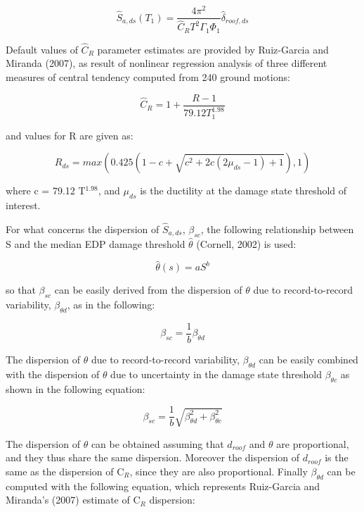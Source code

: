 \begin{equation}
\hat{S}_{a,ds}(T_1) = \frac{4 \pi^2}{\hat{C}_R T^2 \Gamma_1 \Phi_1} \hat{\delta}_{roof, ds}
\label{eq:Sa_RGM}
\end{equation}

Default values of $\hat{C}_R$ parameter estimates are provided by Ruiz-Garcia and Miranda (2007), as result of nonlinear regression analysis of three different measures of central tendency computed from 240 ground motions:

\begin{equation}
\hat{C}_R = 1 + \frac{R - 1}{79.12 T_1 ^{1.98}}
\label{eq:Cr_RGM}
\end{equation}

and values for R are given as:

\begin{equation}
R_{ds} = max(0.425(1 - c + \sqrt{c^2 + 2c(2 \mu_{ds} - 1) + 1}),1)
\label{eq:R_RGM}
\end{equation}

where c = 79.12 T$^{1.98}$, and $\mu_{ds}$ is the ductility at the damage state threshold of interest.

For what concerns the dispersion of $\hat{S}_{a,ds}$, $\beta_{sc}$, the following relationship between S and the median EDP damage threshold $\hat{\theta}$ (Cornell, 2002) is used:

\begin{equation}
\hat{\theta}(s) = a S^b
\end{equation}

so that $\beta_{sc}$ can be easily derived from the dispersion of $\theta$ due to record-to-record variability, $\beta_{\theta d}$, as in the following:

\begin{equation}
\beta_{sc} = \frac{1}{b} \beta_{\theta d}
\label{eq:betaSa_RGM}
\end{equation}

The dispersion of $\theta$ due to record-to-record variability, $\beta_{\theta d}$ can be easily combined with the dispersion of $\theta$ due to uncertainty in the damage state threshold $\beta_{\theta c}$ as shown in the following equation:

\begin{equation}
\beta_{sc} = \frac{1}{b} \sqrt{\beta_{\theta d}^2 + \beta_{\theta c}^2}
\label{eq:betaSc_RGM}
\end{equation}

The dispersion of $\theta$ can be obtained assuming that $d_{roof}$ and $\theta$ are proportional, and they thus share the same dispersion. Moreover the dispersion of $d_{roof}$ is the same as the dispersion of C$_R$, since they are also proportional. Finally $\beta_{\theta d}$ can be computed with the following equation, which represents Ruiz-Garcia and Miranda's (2007) estimate of C$_R$ dispersion:

